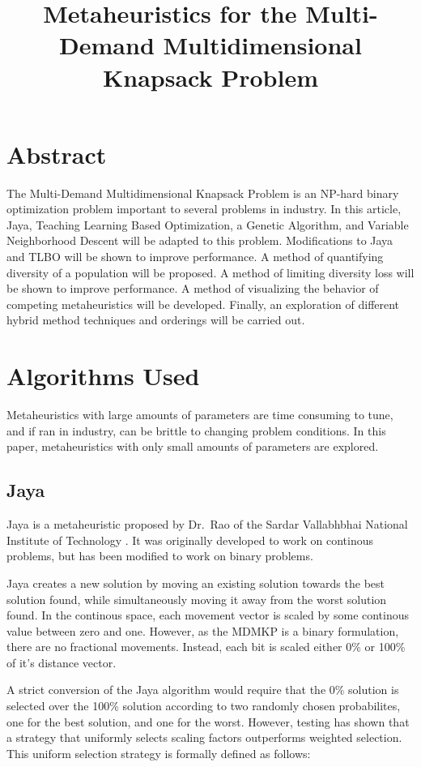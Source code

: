\documentclass[11pt, letterpaper, onecolumn]{article}
\title{\textbf{Metaheuristics for the Multi-Demand Multidimensional Knapsack Problem}}
\begin{document}
\maketitle

\section{Abstract}
The Multi-Demand Multidimensional Knapsack Problem is an NP-hard binary optimization problem important to several problems in industry. In this article, Jaya, Teaching Learning Based Optimization, a Genetic Algorithm, and Variable Neighborhood Descent will be adapted to this problem. Modifications to Jaya and TLBO will be shown to improve performance. A method of quantifying diversity of a population will be proposed. A method of limiting diversity loss will be shown to improve performance. A method of visualizing the behavior of competing metaheuristics will be developed. Finally, an exploration of different hybrid method techniques and orderings will be carried out. 

\section{Algorithms Used}

Metaheuristics with large amounts of parameters are time consuming to tune, and if ran in industry, can be brittle to changing problem conditions. In this paper, metaheuristics with only small amounts of parameters are explored. 

\subsection{Jaya}

Jaya is a metaheuristic proposed by Dr.~Rao of the Sardar Vallabhbhai National
Institute of Technology%
. It was originally developed to work on continous
problems, but has been modified to work on binary problems.

Jaya creates a new solution by moving an existing solution towards the best solution found, while simultaneously moving it away from the worst solution found. In the continous space, each movement vector is scaled by some continous value between zero and one. However, as the MDMKP is a binary formulation, there are no fractional movements. Instead, each bit is scaled either 0\% or 100\% of it's distance vector. 

A strict conversion of the Jaya algorithm would require that the 0\% solution is selected over the 100\% solution according to two randomly chosen probabilites, one for the best solution, and one for the worst. However, testing has shown that a strategy that uniformly selects scaling factors outperforms weighted selection. This uniform selection strategy is formally defined as follows: 
\end{document}
